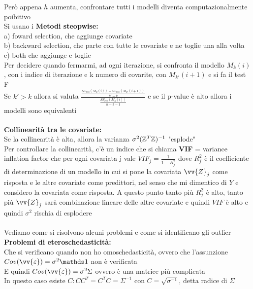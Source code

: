 Però appena $h$ aumenta, confrontare tutti i modelli diventa computazionalmente poibitivo\\


Si usano i \textbf{Metodi steopwise:}\\
a) foward selection, che aggiunge covariate \\
b) backward selection, che parte con tutte le covariate e ne toglie una alla volta\\
c) both che aggiunge e toglie\\

Per decidere quando fermarmi, ad ogni iterazione, si confronta il modello $M_k(i)$, con i indice di iterazione e k numero di covarite, con $M_{k'}(i+1)$ e si fa il test F\skipp\\
Se $k'>k$ allora si valuta $\frac{\tfrac{SS_{res}(M_k(i))-SS_{res}(M_{k'}(i+1))}{k'-k}}{\tfrac{SS_{res}(M_k(i))}{n-k-1}}$ e se il p-value è alto allora i modelli sono equivalenti\\ \\


\textbf{Collinearità tra le covariate:}\\

Se la collinearità è alta, allora la varianza $\sigma^2(\mathbb Z^T\mathbb Z)^{-1}$ "esplode"\\
Per controllare la collinearità, c'è un indice che si chiama \textbf{VIF} = variance inflation factor che per ogni covariata j vale $VIF_j= \frac{1}{1-R^2_j}$ dove $R^2_j$ è il coefficiente di determinazione di un modello in cui si pone la covariata $\vv{Z}_j$ come risposta e le altre covariate come predittori, nel senso che mi dimentico di $Y$ e considero la covariata come risposta. A questo punto tanto più $R^2_j$ è alto, tanto più $\vv{Z}_j$ sarà combinazione lineare delle altre covariate e quindi $VIF$ è alto e quindi $\sigma^2$ rischia di esplodere\\ \\



Vediamo come si risolvono alcuni problemi e come si identificano gli outlier\\


\textbf{Problemi di eteroschedasticità:}\\
Che si verificano quando non ho omoschedasticità, ovvero che l'assunzione $Cov(\vv{\eps})=\sigma^2\II$ non è verificata\\
E quindi $Cov(\vv{\eps})=\sigma^2\Sigma$ ovvero è una matrice più complicata\\
In questo caso esiste $C : CC^T = C^TC = \Sigma^{-1}$ con $C=\sqrt{\sigma^{-1}}$, detta radice di $\Sigma$\\

